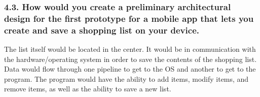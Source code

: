 \documentclass[12pt]{article}
\begin{document}
\subsubsection*{4.3. How would you create a preliminary architectural design for the first prototype for a mobile app that lets you create and save a shopping list on your device.}
The list itself would be located in the center. It would be in communication with the hardware/operating system in order to save the contents of the shopping list. Data would flow through one pipeline to get to the OS and another to get to the program. The program would have the ability to add items, modify items, and remove items, as well as the ability to save a new list.
\end{document}
